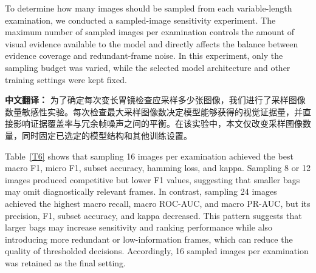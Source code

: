 \documentclass[Afour,sagev,times]{sagej}
\begin{document}
To determine how many images should be sampled from each variable-length examination, we conducted a sampled-image sensitivity experiment. The maximum number of sampled images per examination controls the amount of visual evidence available to the model and directly affects the balance between evidence coverage and redundant-frame noise. In this experiment, only the sampling budget was varied, while the selected model architecture and other training settings were kept fixed.

\textbf{中文翻译：} 为了确定每次变长胃镜检查应采样多少张图像，我们进行了采样图像数量敏感性实验。每次检查最大采样图像数决定模型能够获得的视觉证据量，并直接影响证据覆盖率与冗余帧噪声之间的平衡。在该实验中，本文仅改变采样图像数量，同时固定已选定的模型结构和其他训练设置。

\begin{table}[h]
\scriptsize\sf\centering
\caption{Sensitivity analysis of the maximum sampled images per examination.\label{T6}}
\end{table}

Table~\ref{T6} shows that sampling 16 images per examination achieved the best macro F1, micro F1, subset accuracy, hamming loss, and kappa. Sampling 8 or 12 images produced competitive but lower F1 values, suggesting that smaller bags may omit diagnostically relevant frames. In contrast, sampling 24 images achieved the highest macro recall, macro ROC-AUC, and macro PR-AUC, but its precision, F1, subset accuracy, and kappa decreased. This pattern suggests that larger bags may increase sensitivity and ranking performance while also introducing more redundant or low-information frames, which can reduce the quality of thresholded decisions. Accordingly, 16 sampled images per examination was retained as the final setting.
\end{document}
